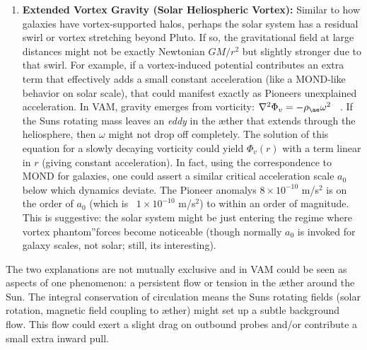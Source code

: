 \documentclass[a4paper, aps,preprint,superscriptaddress, 12pt]{revtex4}
\begin{document}
\begin{enumerate}
\item
\textbf{Extended Vortex Gravity (Solar Heliospheric Vortex):} Similar to how galaxies have vortex-supported halos, perhaps the solar system has a residual swirl or vortex stretching beyond Pluto. If so, the gravitational field at large distances might not be exactly Newtonian $GM/r^2$ but slightly stronger due to that swirl. For example, if a vortex-induced potential contributes an extra term that effectively adds a small constant acceleration (like a MOND-like behavior on solar scale), that could manifest exactly as Pioneer\rqs s unexplained acceleration. In VAM, gravity emerges from vorticity: $\nabla^2 \Phi_v = -\rho_{\ae}\omega^2$~\cite{Iskandarani2025b} . If the Sun\rqs s rotating mass leaves an \textit{eddy} in the æther that extends through the heliosphere, then $\omega$ might not drop off completely. The solution of this equation for a slowly decaying vorticity could yield $\Phi_v(r)$ with a term linear in $r$ (giving constant acceleration). In fact, using the correspondence to MOND for galaxies, one could assert a similar critical acceleration scale $a_0$ below which dynamics deviate. The Pioneer anomaly\rqs s $8\times10^{-10}$ m/s$^2$ is on the order of $a_0$ (which is ~$1\times10^{-10}$ m/s$^2$) to within an order of magnitude. This is suggestive: the solar system might be just entering the regime where vortex \grqq phantom\textquotedblright forces become noticeable (though normally $a_0$ is invoked for galaxy scales, not solar; still, it\rqs s interesting).




\end{enumerate}

The two explanations are not mutually exclusive and in VAM could be seen as aspects of one phenomenon: a persistent flow or tension in the æther around the Sun. The integral conservation of circulation means the Sun\rqs s rotating fields (solar rotation, magnetic field coupling to æther) might set up a subtle background flow. This flow could exert a slight drag on outbound probes and/or contribute a small extra inward pull.
\end{document}
